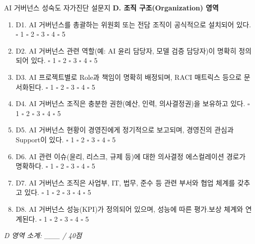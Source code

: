 \begin{practicaltool}{AI 거버넌스 성숙도 자가진단 설문지}
\textbf{D. 조직 구조(Organization) 영역}
\begin{enumerate}
 \item D1. AI 거버넌스를 총괄하는 위원회 또는 전담 조직이 공식적으로 설치되어 있다. \hfill $\square$ 1 $\square$ 2 $\square$ 3 $\square$ 4 $\square$ 5
 \item D2. AI 거버넌스 관련 역할(예: AI 윤리 담당자, 모델 검증 담당자)이 명확히 정의되어 있다. \hfill $\square$ 1 $\square$ 2 $\square$ 3 $\square$ 4 $\square$ 5
 \item D3. AI 프로젝트별로 Role과 책임이 명확히 배정되며, RACI 매트릭스 등으로 문서화된다. \hfill $\square$ 1 $\square$ 2 $\square$ 3 $\square$ 4 $\square$ 5
 \item D4. AI 거버넌스 조직은 충분한 권한(예산, 인력, 의사결정권)을 보유하고 있다. \hfill $\square$ 1 $\square$ 2 $\square$ 3 $\square$ 4 $\square$ 5
 \item D5. AI 거버넌스 현황이 경영진에게 정기적으로 보고되며, 경영진의 관심과 Support이 있다. \hfill $\square$ 1 $\square$ 2 $\square$ 3 $\square$ 4 $\square$ 5
 \item D6. AI 관련 이슈(윤리, 리스크, 규제 등)에 대한 의사결정 에스컬레이션 경로가 명확하다. \hfill $\square$ 1 $\square$ 2 $\square$ 3 $\square$ 4 $\square$ 5
 \item D7. AI 거버넌스 조직은 사업부, IT, 법무, 준수 등 관련 부서와 협업 체계를 갖추고 있다. \hfill $\square$ 1 $\square$ 2 $\square$ 3 $\square$ 4 $\square$ 5
 \item D8. AI 거버넌스 성능(KPI)가 정의되어 있으며, 성능에 따른 평가.보상 체계와 연계된다. \hfill $\square$ 1 $\square$ 2 $\square$ 3 $\square$ 4 $\square$ 5
\end{enumerate}
\textit{D 영역 소계: \_\_\_ / 40점}


\end{practicaltool}
